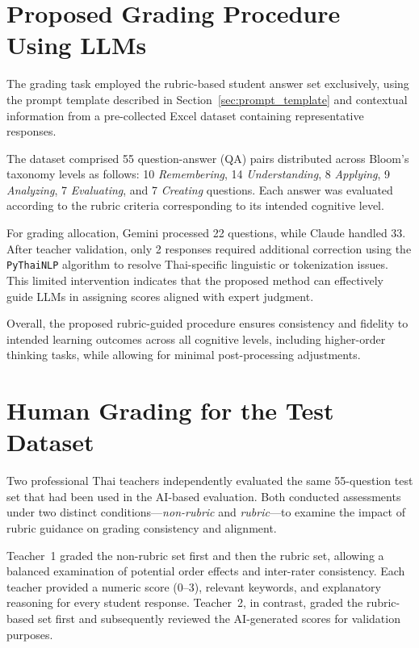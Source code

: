 
\section{Proposed Grading Procedure Using LLMs}

The grading task employed the rubric-based student answer set 
exclusively, using the prompt template described in 
Section~\ref{sec:prompt_template} and contextual information 
from a pre-collected Excel dataset containing representative 
responses.

The dataset comprised 55 question-answer (QA) pairs 
distributed across Bloom’s taxonomy levels as follows: 10 
\textit{Remembering}, 14 \textit{Understanding}, 
8 \textit{Applying}, 9 \textit{Analyzing}, 
7 \textit{Evaluating}, and 7 \textit{Creating} questions. 
Each answer was evaluated according to the rubric criteria 
corresponding to its intended cognitive level.

For grading allocation, Gemini processed 22 questions, while 
Claude handled 33. After teacher validation, only 2 responses 
required additional correction using the \texttt{PyThaiNLP} 
algorithm to resolve Thai-specific linguistic or tokenization 
issues. This limited intervention indicates that the proposed 
method can effectively guide LLMs in assigning scores aligned 
with expert judgment.

Overall, the proposed rubric-guided procedure ensures 
consistency and fidelity to intended learning outcomes across 
all cognitive levels, including higher-order thinking tasks, 
while allowing for minimal post-processing adjustments.


\section{Human Grading for the Test Dataset}

Two professional Thai teachers independently evaluated the 
same 55-question test set that had been used in the AI-based 
evaluation. Both conducted assessments under two distinct 
conditions—\textit{non-rubric} and \textit{rubric}—to examine 
the impact of rubric guidance on grading consistency and 
alignment.

Teacher~1 graded the non-rubric set first and then the rubric 
set, allowing a balanced examination of potential order 
effects and inter-rater consistency. Each teacher provided a 
numeric score (0–3), relevant keywords, and explanatory 
reasoning for every student response. Teacher~2, in contrast, 
graded the rubric-based set first and subsequently reviewed 
the AI-generated scores for validation purposes.

